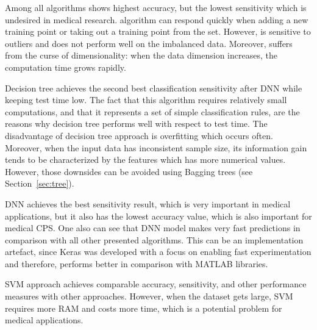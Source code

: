 Among all algorithms \knn{} shows highest accuracy, but the lowest 
sensitivity which is undesired in medical research. 
\knn{} algorithm can respond quickly when adding a new training 
point or taking out a training point from the set. However, \knn{} is 
sensitive to outliers and does not perform well on the imbalanced 
data. 
Moreover, \knn{} suffers from the curse of dimensionality: when the 
data dimension increases, the computation time grows rapidly. 

Decision tree achieves the second best 
classification sensitivity after DNN while keeping test time low. 
The fact that this algorithm requires relatively small computations, 
and that it represents a set of simple classification rules, are the 
reasons why decision tree performs well with respect to test time. 
The disadvantage of decision tree approach is overfitting which 
occurs often. Moreover, when the input 
data has inconsistent sample size, its information gain tends to be 
characterized by the features which has more numerical values. 
However, those downsides can be avoided using Bagging trees (see 
Section~\ref{sec:tree}).

DNN achieves the best sensitivity result, which is very important in 
medical applications, but it also has the lowest accuracy value, 
which is also important for medical CPS.  
One also can see that DNN model makes very fast predictions in 
comparison with all other presented algorithms. This can be an 
implementation artefact, since Keras was developed with a focus on 
enabling fast experimentation and therefore, performs better in 
comparison with MATLAB libraries. 

SVM approach achieves comparable accuracy, sensitivity, and 
other performance 
measures with other approaches. 
However, when the dataset gets large, SVM requires more RAM 
and costs more time, which is a potential problem for medical 
applications. 



